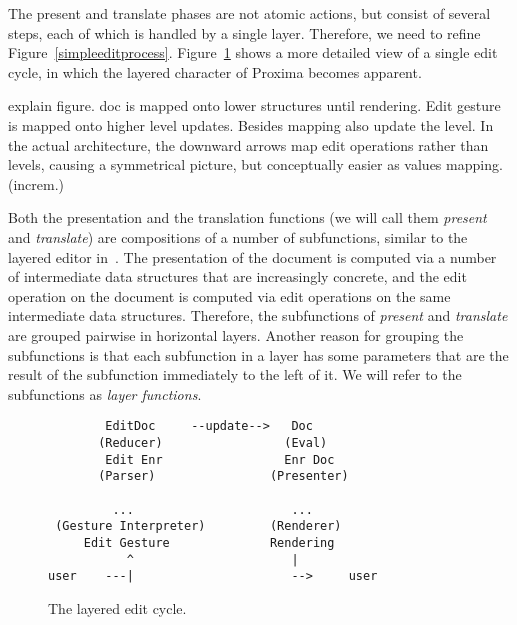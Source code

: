 The present and translate phases are not atomic actions, but consist of several steps, each of which is handled by a single layer. Therefore, we need to refine Figure~\ref{simpleeditprocess}. Figure~\ref{simplelayers} shows a more detailed view of a single edit cycle, in which the layered character of Proxima becomes apparent. 

explain figure. doc is mapped onto lower structures until rendering. Edit gesture is mapped onto higher level updates. Besides mapping also update the level.
In the actual architecture, the downward arrows map edit operations rather than levels, causing a symmetrical picture, but conceptually easier as values mapping. (increm.)

\bc
Both the presentation and the translation functions (we will call them {\em present} and {\em translate}) are compositions of a number of subfunctions, similar to the layered editor in~\cite{architecture}. The presentation of the document is computed via a number of intermediate data structures that are increasingly concrete, and the edit operation on the document is computed via edit operations on the same intermediate data structures. Therefore, the subfunctions of {\em present} and {\em translate} are grouped pairwise in horizontal layers. Another reason for grouping the subfunctions is that each subfunction in a layer has some parameters that are the result of the subfunction immediately to the left of it. We will refer to the subfunctions as {\em layer functions}.
\ec

\begin{figure}
\begin{small}
\begin{center}
\begin{center}
\begin{scriptsize}
\begin{verbatim}
        EditDoc     --update-->   Doc         
       (Reducer)                 (Eval)       
        Edit Enr                 Enr Doc      
       (Parser)                (Presenter)    
                                              
         ...                      ...         
 (Gesture Interpreter)         (Renderer)     
     Edit Gesture              Rendering      
           ^                      |           
user    ---|                      -->     user
\end{verbatim}
\end{scriptsize}
\end{center}\caption{The layered edit cycle.} \label{simplelayers} 
\end{center}
\end{small}
\end{figure}


